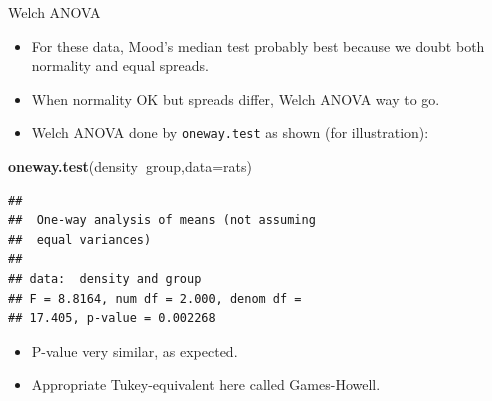 \documentclass[ignorenonframetext,]{beamer}
\newenvironment{Shaded}{\begin{snugshade}}{\end{snugshade}}
\newcommand{\DataTypeTok}[1]{\textcolor[rgb]{0.13,0.29,0.53}{#1}}
\newcommand{\KeywordTok}[1]{\textcolor[rgb]{0.13,0.29,0.53}{\textbf{#1}}}
\newcommand{\NormalTok}[1]{#1}
\newcommand{\OperatorTok}[1]{\textcolor[rgb]{0.81,0.36,0.00}{\textbf{#1}}}
\providecommand{\tightlist}{%
  \setlength{\itemsep}{0pt}\setlength{\parskip}{0pt}}
\begin{document}
\begin{frame}[fragile]{Welch ANOVA}
\protect\hypertarget{welch-anova}{}

\begin{itemize}
\tightlist
\item
  For these data, Mood's median test probably best because we doubt both
  normality and equal spreads.
\item
  When normality OK but spreads differ, Welch ANOVA way to go.
\item
  Welch ANOVA done by \texttt{oneway.test} as shown (for illustration):
\end{itemize}

\begin{Shaded}
\begin{Highlighting}[]
\KeywordTok{oneway.test}\NormalTok{(density}\OperatorTok{~}\NormalTok{group,}\DataTypeTok{data=}\NormalTok{rats)}
\end{Highlighting}
\end{Shaded}

\begin{verbatim}
## 
##  One-way analysis of means (not assuming
##  equal variances)
## 
## data:  density and group
## F = 8.8164, num df = 2.000, denom df =
## 17.405, p-value = 0.002268
\end{verbatim}

\begin{itemize}
\tightlist
\item
  P-value very similar, as expected.
\item
  Appropriate Tukey-equivalent here called Games-Howell.
\end{itemize}

\end{frame}
\end{document}

